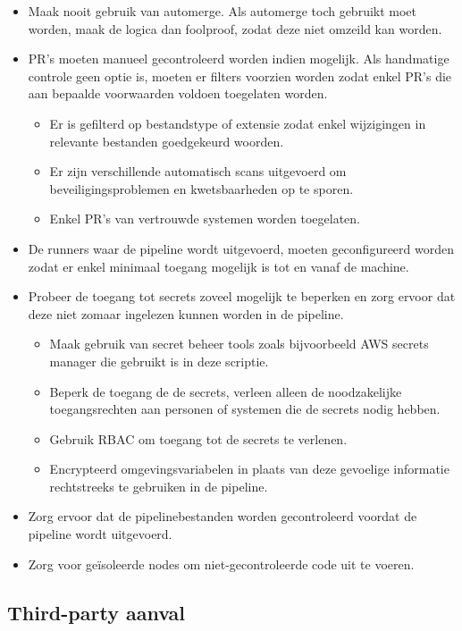 \begin{itemize}
  \item Maak nooit gebruik van automerge. Als automerge toch gebruikt moet worden, maak de logica dan foolproof, zodat deze niet omzeild kan worden.
  \item PR's moeten manueel gecontroleerd worden indien mogelijk. Als handmatige controle geen optie is, moeten er filters voorzien worden zodat enkel PR's die aan bepaalde voorwaarden voldoen toegelaten worden.
  \begin{itemize}
    \item Er is gefilterd op bestandstype of extensie zodat enkel wijzigingen in relevante bestanden goedgekeurd woorden.
    \item Er zijn verschillende automatisch scans uitgevoerd om beveiligingsproblemen en kwetsbaarheden op te sporen.
    \item Enkel PR's van vertrouwde systemen worden toegelaten.
  \end{itemize}
  \item De runners waar de pipeline wordt uitgevoerd, moeten geconfigureerd worden zodat er enkel minimaal toegang mogelijk is tot en vanaf de machine.
  \item Probeer de toegang tot secrets zoveel mogelijk te beperken en zorg ervoor dat deze niet zomaar ingelezen kunnen worden in de pipeline.
  \begin{itemize}
    \item Maak gebruik van secret beheer tools zoals bijvoorbeeld AWS secrets manager die gebruikt is in deze scriptie.
    \item Beperk de toegang de de secrets, verleen alleen de noodzakelijke toegangsrechten aan personen of systemen die de secrets nodig hebben.
    \item Gebruik RBAC om toegang tot de secrets te verlenen.
    \item Encrypteerd omgevingsvariabelen in plaats van deze gevoelige informatie rechtstreeks te gebruiken in de pipeline. 
  \end{itemize}
  \item Zorg ervoor dat de pipelinebestanden worden gecontroleerd voordat de pipeline wordt uitgevoerd.
  \item Zorg voor geïsoleerde nodes om niet-gecontroleerde code uit te voeren.
\end{itemize}

\subsection{
{Third-party aanval}}
\label{sec:}

